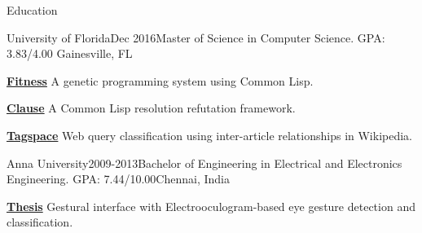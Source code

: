 \documentclass{resume} %
\begin{document}

\begin{rSection}{Education}
\vspace{2mm}

\begin{rSubsection}{University of Florida}{Dec 2016}{Master of Science in Computer Science. GPA: 3.83/4.00
}{Gainesville, FL}
\item {\bf {\href{http://github.com/pranavrc/fitness/}{Fitness}}} A genetic programming system using Common Lisp.
\item {\bf {\href{http://github.com/pranavrc/clause/}{Clause}}} A Common Lisp resolution refutation framework.
\item {\bf {\href{http://github.com/pranavrc/tagspace/}{Tagspace}}} Web query classification using inter-article relationships in Wikipedia.
\end{rSubsection}

\begin{rSubsection}{Anna University}{2009-2013}{Bachelor of Engineering in Electrical and Electronics Engineering. GPA: 7.44/10.00}{Chennai, India}
\item {\bf {\href{http://onloop.net/hairyplotter/}{Thesis}}} Gestural interface with Electrooculogram-based eye gesture detection and classification.
\end{rSubsection}

\end{rSection}

\end{document}
